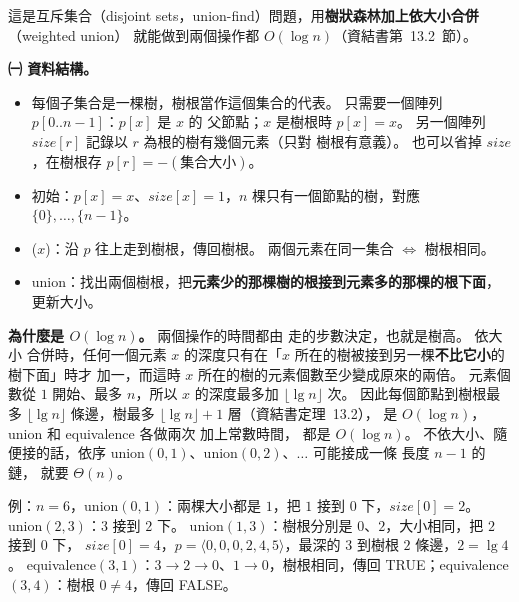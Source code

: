 \begin{pastsoln}
這是互斥集合（disjoint sets，union-find）問題，用\textbf{樹狀森林加上依大小合併}（weighted union）
就能做到兩個操作都 $O(\log n)$（資結書第~13.2~節）。

\textbf{㈠ 資料結構。}
\begin{itemize}[nosep]
\item 每個子集合是一棵樹，樹根當作這個集合的代表。 只需要一個陣列 $p[0..n-1]$：$p[x]$ 是 $x$ 的
父節點；$x$ 是樹根時 $p[x] = x$。 另一個陣列 $\mathit{size}[r]$ 記錄以 $r$ 為根的樹有幾個元素（只對
樹根有意義）。 也可以省掉 $\mathit{size}$，在樹根存 $p[r] = -(\text{集合大小})$。
\item 初始：$p[x] = x$、$\mathit{size}[x] = 1$，$n$ 棵只有一個節點的樹，對應 $\{0\}, \ldots,
\{n-1\}$。
\item {}($x$)：沿 $p$ 往上走到樹根，傳回樹根。 兩個元素在同一集合 $\iff$ 樹根相同。
\item union：找出兩個樹根，把\textbf{元素少的那棵樹的根接到元素多的那棵的根下面}，更新大小。
\end{itemize}
\textbf{為什麼是 $O(\log n)$。} 兩個操作的時間都由  走的步數決定，也就是樹高。 依大小
合併時，任何一個元素 $x$ 的深度只有在「$x$ 所在的樹被接到另一棵\textbf{不比它小}的樹下面」時才
加一，而這時 $x$ 所在的樹的元素個數至少變成原來的兩倍。 元素個數從 $1$ 開始、最多 $n$，所以
$x$ 的深度最多加 $\lfloor \lg n \rfloor$ 次。 因此每個節點到樹根最多 $\lfloor \lg n \rfloor$ 條邊，樹最多 $\lfloor \lg n \rfloor + 1$
層（資結書定理~13.2）， 是 $O(\log n)$，union 和 equivalence 各做兩次  加上常數時間，
都是 $O(\log n)$。 不依大小、隨便接的話，依序 union$(0,1)$、union$(0,2)$、$\ldots$ 可能接成一條
長度 $n - 1$ 的鏈， 就要 $\Theta(n)$。

例：$n = 6$，union$(0, 1)$：兩棵大小都是 $1$，把 $1$ 接到 $0$ 下，$\mathit{size}[0] = 2$。
union$(2, 3)$：$3$ 接到 $2$ 下。 union$(1, 3)$：樹根分別是 $0$、$2$，大小相同，把 $2$ 接到 $0$ 下，
$\mathit{size}[0] = 4$，$p = \langle 0, 0, 0, 2, 4, 5 \rangle$，最深的 $3$ 到樹根 $2$ 條邊，$2 = \lg 4$。
equivalence$(3, 1)$：$3 \to 2 \to 0$、$1 \to 0$，樹根相同，傳回 TRUE；equivalence$(3, 4)$：樹根
$0 \ne 4$，傳回 FALSE。


\end{pastsoln}
